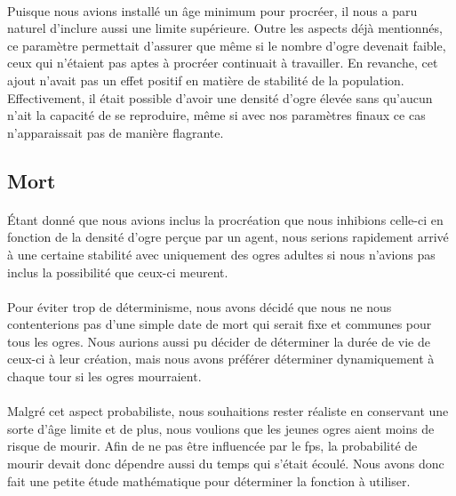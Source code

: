 \paragraph{}
Puisque nous avions installé un âge minimum pour procréer, il nous a paru
naturel d'inclure aussi une limite supérieure. Outre les aspects déjà
mentionnés, ce paramètre permettait d'assurer que même si le nombre d'ogre
devenait faible, ceux qui n'étaient pas aptes à procréer continuait à
travailler. En revanche, cet ajout n'avait pas un effet positif en matière de
stabilité de la population. Effectivement, il était possible d'avoir une
densité d'ogre élevée sans qu'aucun n'ait la capacité de se reproduire, même
si avec nos paramètres finaux ce cas n'apparaissait pas de manière flagrante.

\subsection{Mort}
\paragraph{}
Étant donné que nous avions inclus la procréation que nous inhibions celle-ci
en fonction de la densité d'ogre perçue par un agent, nous serions rapidement
arrivé à une certaine stabilité avec uniquement des ogres adultes si nous
n'avions pas inclus la possibilité que ceux-ci meurent.

\paragraph{}
Pour éviter trop de déterminisme, nous avons décidé que nous ne nous
contenterions pas d'une simple date de mort qui serait fixe et communes pour
tous les ogres. Nous aurions aussi pu décider de déterminer la durée de vie
de ceux-ci à leur création, mais nous avons préférer déterminer dynamiquement
à chaque tour si les ogres mourraient.

\paragraph{}
Malgré cet aspect probabiliste, nous souhaitions rester réaliste en conservant
une sorte d'âge limite et de plus, nous voulions que les jeunes ogres aient
moins de risque de mourir. Afin de ne pas être influencée par le fps, la
probabilité de mourir devait donc dépendre aussi du temps qui s'était écoulé.
Nous avons donc fait une petite étude mathématique pour déterminer la fonction
à utiliser.

